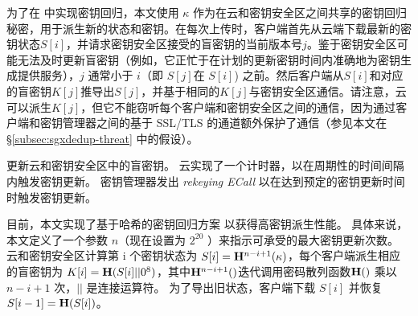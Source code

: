 为了在 \sysnameS 中实现密钥回归，本文使用 $\kappa$ 作为在云和密钥安全区之间共享的密钥回归秘密，用于派生新的状态和密钥。在每次上传时，客户端首先从云端下载最新的密钥状态$S[i]$，并请求密钥安全区接受的盲密钥的当前版本号$j$。鉴于密钥安全区可能无法及时更新盲密钥（例如，它正忙于在计划的更新密钥时间内准确地为密钥生成提供服务），$j$ 通常小于 $i$（即 $S[j]$在 $S[i]$) 之前。然后客户端从$S[i]$和对应的盲密钥$K[j]$推导出$S[j]$，并基于相同的$K[j]$与密钥安全区通信。请注意，云可以派生$K[j]$，但它不能窃听每个客户端和密钥安全区之间的通信，因为通过客户端和密钥管理器之间的基于 SSL/TLS 的通道额外保护了通信（参见本文在 \S\ref{subsec:sgxdedup-threat} 中的假设）。

\sysnameS 更新云和密钥安全区中的盲密钥。 云实现了一个计时器，以在周期性的时间间隔内触发密钥更新。 密钥管理器发出 \textit{ rekeying ECall} 以在达到预定的密钥更新时间时触发密钥更新。

目前，本文实现了基于哈希的密钥回归方案 \cite{fu06} 以获得高密钥派生性能。 具体来说，本文定义了一个参数 $n$（现在设置为 $2^{20}$ \cite{fu06}）来指示可承受的最大密钥更新次数。 云和密钥安全区计算第 i 个密钥状态为 $S[i] = {\bf H}^{n-i+1}(\kappa)$，每个客户端派生相应的盲密钥为 $K[i] = {\bf H}(S[i] || 0^8)$，其中${\bf H}^{n-i+1}()$迭代调用密码散列函数${ \bf H}()$ 乘以 $n-i+1$ 次，$||$ 是连接运算符。 为了导出旧状态，客户端下载 $S[i]$ 并恢复 $S[i-1] = {\bf H}(S[i])$。
